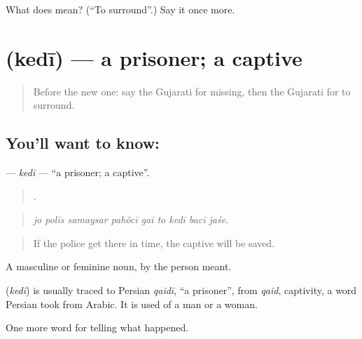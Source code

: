 \begin{tcolorbox}[breakable,colback=teal!4,colframe=teal!35!black,title={Before you move on}]
What does  mean? (\textquotedblleft{}To surround\textquotedblright{}.) Say it once more.
\end{tcolorbox}
\section[\texorpdfstring{\gu{કેદી} (kedī)}{કેદી (kedī)}]{ (kedī) — a prisoner; a captive}

\label{lesson:GU-C291-kedi}



\begin{quote}
Before the new one: say the Gujarati for missing, then the Gujarati for to surround.
\end{quote}

\subsection*{You'll want to know: }
\textbf{} — \emph{kedī} — \textquotedblleft{}a prisoner; a captive\textquotedblright{}.

\begin{quote}
        .
\end{quote}

\begin{quote}
\emph{jo polīs samaysar pahõcī gaī to kedī bacī jaśe.}
\end{quote}

\begin{quote}
If the police get there in time, the captive will be saved.
\end{quote}

A masculine or feminine noun, by the person meant.

\begin{cousinweb}
\textbf{} (\emph{kedī}) is usually traced to Persian \emph{qaidī}, \textquotedblleft{}a prisoner\textquotedblright{}, from \emph{qaid}, captivity, a word Persian took from Arabic. It is used of a man or a woman.
\end{cousinweb}

\begin{grammarlens}[title={What you've built}]
One more word for telling what happened.
\end{grammarlens}

